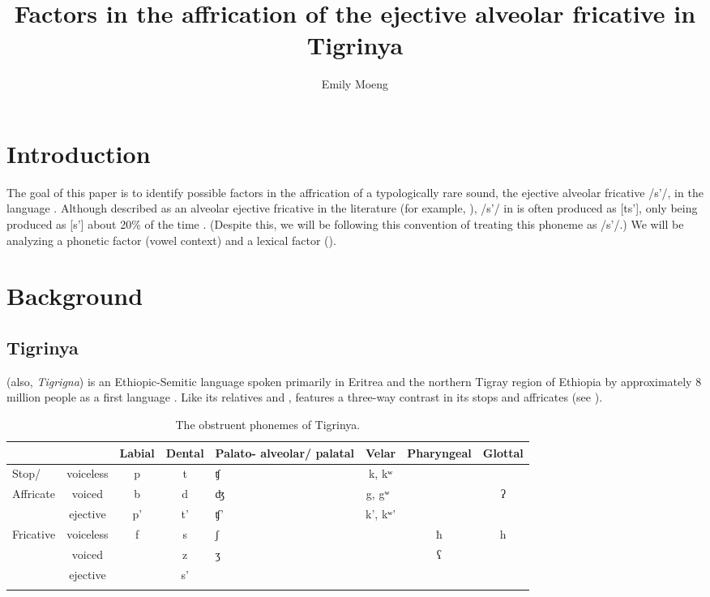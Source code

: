 \documentclass[output=paper
,newtxmath
,modfonts
,nonflat]{langsci/langscibook}
\author{Emily Moeng\affiliation{University of North Carolina, Chapel Hill}}
\title{Factors in the affrication of the ejective alveolar fricative in Tigrinya}
\begin{document}
\maketitle
\section{Introduction}\label{sec:moeng:1}

The goal of this paper is to identify possible factors in the affrication of a typologically rare sound, the ejective alveolar fricative /s’/, in the language . Although described as an alveolar ejective fricative in the literature (for example, \citealt{tewolde2002modern}), /s’/ in  is often produced as [ts’], only being produced as [s’] about 20\% of the time \citep{shosted2011affricating}. (Despite this, we will be following this convention of treating this phoneme as /s’/.)  We will be analyzing a phonetic factor (vowel context) and a lexical factor (). 

\section{Background}\label{sec:moeng:2}

\subsection{Tigrinya}\label{sec:moeng:2.1}

 (also, \textit{Tigrigna}) is an Ethiopic-Semitic language spoken primarily in Eritrea and the northern Tigray region of Ethiopia by approximately 8 million people as a first language \citep{lewisetal2016}. Like its relatives  and ,  features a three-way contrast in its stops and affricates (see ).

\begin{table}
\small
\begin{tabularx}{\textwidth}{lccc Q ccc}
\lsptoprule
 &  & Labial & Dental & Palato- alveolar/ palatal& Velar & Pharyngeal & Glottal\\
 \midrule
Stop/& voiceless & p & t & ʧ & k, kʷ &  & \\
Affricate & voiced & b & d & ʤ & g, gʷ~ &  & ʔ\\
 & ejective & p’ & t' & ʧ’ & k', kʷ’ &  & \\
Fricative & voiceless & f & s & ʃ &  & ħ & h\\
 & voiced &  & z & ʒ &  & ʕ & \\
 & ejective &  & s’ &  &  &  & \\
\lspbottomrule
\end{tabularx}
\caption{The obstruent phonemes of Tigrinya.}
\label{tab:moeng:1}
\end{table}
\end{document}
